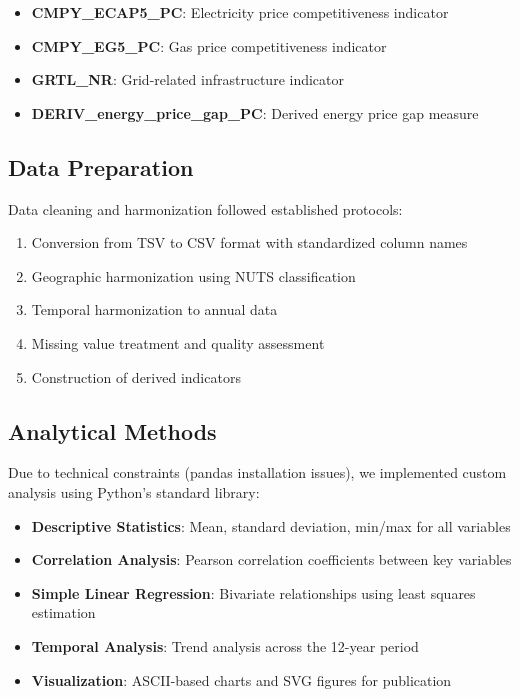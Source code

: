 \documentclass[11pt,a4paper]{article}
\begin{document}
\begin{itemize}
\item \textbf{CMPY\_ECAP5\_PC}: Electricity price competitiveness indicator
\item \textbf{CMPY\_EG5\_PC}: Gas price competitiveness indicator  
\item \textbf{GRTL\_NR}: Grid-related infrastructure indicator
\item \textbf{DERIV\_energy\_price\_gap\_PC}: Derived energy price gap measure
\end{itemize}

\subsection{Data Preparation}

Data cleaning and harmonization followed established protocols:
\begin{enumerate}
\item Conversion from TSV to CSV format with standardized column names
\item Geographic harmonization using NUTS classification
\item Temporal harmonization to annual data
\item Missing value treatment and quality assessment
\item Construction of derived indicators
\end{enumerate}

\subsection{Analytical Methods}

Due to technical constraints (pandas installation issues), we implemented custom analysis using Python's standard library:

\begin{itemize}
\item \textbf{Descriptive Statistics}: Mean, standard deviation, min/max for all variables
\item \textbf{Correlation Analysis}: Pearson correlation coefficients between key variables
\item \textbf{Simple Linear Regression}: Bivariate relationships using least squares estimation
\item \textbf{Temporal Analysis}: Trend analysis across the 12-year period
\item \textbf{Visualization}: ASCII-based charts and SVG figures for publication
\end{itemize}
\end{document}
